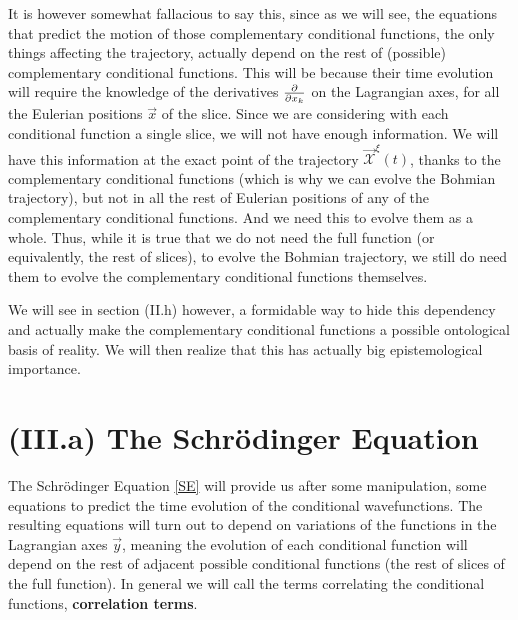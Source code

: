 \documentclass[11pt, a4paper]{article} %
\newcommand{\x}{\mathcal{X}}
\begin{document}
It is however somewhat fallacious to say this, since as we will see, the equations that predict the motion of those complementary conditional functions, the only things affecting the trajectory, actually depend on the rest of (possible) complementary conditional functions. This will be because their time evolution will require the knowledge of the derivatives $\pdv{}{x_k}$ on the Lagrangian axes, for all the Eulerian positions $\vec{x}$ of the slice. Since we are considering with each conditional function a single slice, we will not have enough information. We will have this information at the exact point of the trajectory $\vec{\x}^\xi(t)$, thanks to the complementary conditional functions (which is why we can evolve the Bohmian trajectory), but not in all the rest of Eulerian positions of any of the complementary conditional functions. And we need this to evolve them as a whole. Thus, while it is true that we do not need the full function (or equivalently, the rest of slices), to evolve the Bohmian trajectory, we still do need them to evolve the complementary conditional functions themselves.

We will see in section (II.h) however, a formidable way to hide this dependency and actually make the complementary conditional functions a possible ontological basis of reality. We will then realize that this has actually big epistemological importance.

\newpage


\section*{(III.a) The Schrödinger Equation}
The Schrödinger Equation \eqref{SE} will provide us after some manipulation, some equations to predict the time evolution of the conditional wavefunctions. The resulting equations will turn out to depend on variations of the functions in the Lagrangian axes $\vec{y}$, meaning the evolution of each conditional function will depend on the rest of adjacent possible conditional functions (the rest of slices of the full function). In general we will call the terms correlating the conditional functions, {\bf correlation terms}.
\end{document}
